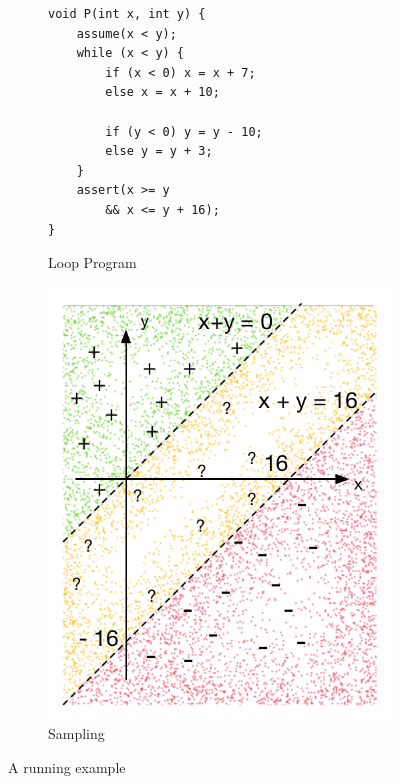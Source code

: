 \begin{figure}[t]
\begin{subfigure}{0.5\textwidth}
    \raggedright
    \vspace{0.5cm}
{\scriptsize\begin{verbatim}
void P(int x, int y) {
    assume(x < y);
    while (x < y) {
        if (x < 0) x = x + 7;
        else x = x + 10;

        if (y < 0) y = y - 10;
        else y = y + 3;
    }
    assert(x >= y
        && x <= y + 16);
}
\end{verbatim}}
    \vspace{0.5cm}
    \caption{Loop Program}
    \label{fig:running:example:program}
\end{subfigure}%
\begin{subfigure}{.5\textwidth}
      \centering
      \includegraphics[scale=0.42]{figures/running-sampling.pdf}
      \caption{Sampling}
      \label{fig:running:example:sampling}
\end{subfigure}
\caption{A running example}
\label{fig:running:example}
\end{figure}

